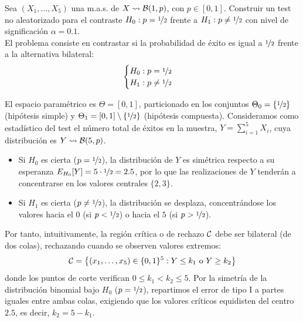 \begin{ejemplo}
    Sea $(X_1,\ldots,X_5)$ una m.a.s. de $X\rightsquigarrow \mathcal{B}(1,p)$, con $p\in[0,1]$. Construir un test no aleatorizado para el contraste $H_0:p=\nicefrac{1}{2}$ frente a $H_1:p\neq\nicefrac{1}{2}$ con nivel de significación $\alpha = 0.1$.\\

    El problema consiste en contrastar si la probabilidad de éxito es igual a $\nicefrac{1}{2}$ frente a la alternativa bilateral:
    \begin{align*}
        \begin{cases}
        H_0: p = \nicefrac{1}{2} \\
        H_1: p \neq \nicefrac{1}{2}
        \end{cases}
    \end{align*}

    El espacio paramétrico es $\Theta = [0,1]$, particionado en los conjuntos $\Theta_0 = \{\nicefrac{1}{2}\}$ (hipótesis simple) y $\Theta_1 = [0,1]\setminus\{\nicefrac{1}{2}\}$ (hipótesis compuesta). Consideramos como estadístico del test el número total de éxitos en la muestra, $Y = \sum\limits_{i=1}^{5} X_i$, cuya distribución es $Y \rightsquigarrow \mathcal{B}(5,p)$.
    \begin{itemize}
        \item Si $H_0$ es cierta ($p = \nicefrac{1}{2}$), la distribución de $Y$ es simétrica respecto a su esperanza $E_{H_0}[Y] = 5 \cdot \nicefrac{1}{2} = 2.5$, por lo que las realizaciones de $Y$ tenderán a concentrarse en los valores centrales $\{2, 3\}$.
        \item Si $H_1$ es cierta ($p \neq \nicefrac{1}{2}$), la distribución se desplaza, concentrándose los valores hacia el $0$ (si $p < \nicefrac{1}{2}$) o hacia el $5$ (si $p > \nicefrac{1}{2}$).
    \end{itemize}

    Por tanto, intuitivamente, la región crítica o de rechazo $\mathcal{C}$ debe ser bilateral (de dos colas), rechazando cuando se observen valores extremos:
    \begin{equation*}
        \mathcal{C} = \left\{(x_1, \dots, x_5) \in \{0,1\}^5 : Y \leq k_1 \text{ o } Y \geq k_2\right\}
    \end{equation*}
    donde los puntos de corte verifican $0 \leq k_1 < k_2 \leq 5$. Por la simetría de la distribución binomial bajo $H_0$ ($p = \nicefrac{1}{2}$), repartimos el error de tipo I a partes iguales entre ambas colas, exigiendo que los valores críticos equidisten del centro $2.5$, es decir, $k_2 = 5 - k_1$.


\end{ejemplo}
